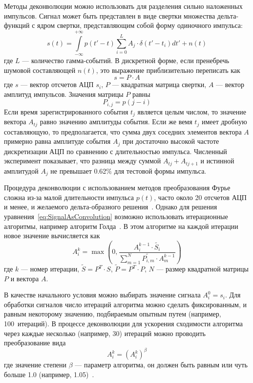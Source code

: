 Методы деконволюции можно использовать для разделения сильно наложенных импульсов. Сигнал может быть представлен в виде свертки множества дельта-функций с ядром свертки, представляющим собой форму одиночного импульса: 
\begin{equation}
  \label{eq:SignalAsConvolution}
  s(t) = \int \limits_{-\infty}^{+\infty} p( t' - t ) \sum \limits_{i=0}^{L} A_j \cdot \delta(t' - t_i) dt' + n(t)
\end{equation}
где $L$ --- количество гамма-событий. В дискретной форме, если пренебречь шумовой составляющей $n(t)$, это выражение приблизительно переписать как 
\begin{equation}
  s = P \cdot A
\end{equation}
где $s$ --- вектор отсчетов АЦП $s_i$, $P$ --- квадратная матрица свертки, $A$ --- вектор амплитуд импульсов. Значения матрицы $P$ равны
\begin{equation*}
  P_{i,j} = p( j - i )
\end{equation*}
Если время зарегистрированного события $t_j$ является целым числом, то значение вектора $A_{tj}$ равно значению амплитуды события. Если же вемя $t_j$ имеет дробную составляющую, то предполагается, что сумма двух соседних элементов вектора $A$ примерно равна амплитуде события $A_j$ при достаточно высокой частоте дискретизации АЦП по сравнению с длительностью импульса. Численный эксперимент показывает, что разница между суммой $A_{tj} + A_{tj+1}$ и истинной амплитудой $A_j$ не превышает 0.62\% для тестовой формы импульса.

Процедура деконволюции с использованием методов преобразования Фурье сложна из-за малой длительности импульса $p(t)$, часто около 20 отсчетов АЦП и менее, и желаемого дельта-образного решения~\cite{Morhac2011}. Однако для решения уравнения~\ref{eq:SignalAsConvolution} возможно использовать итерационные алгоритмы, например алгоритм Голда~\cite{Gold1964}. В этом алгоритме на каждой итерации новое значение вычисляется как
\begin{equation*}
  A_i^k = \max \left( 0, \frac{A_i^{k-1} \cdot \widetilde{S_i} }{ \sum_{m=1}^{N} \widetilde{ P_{i,m} } \cdot A_m^{k-1} } \right)
\end{equation*}
где $k$ --- номер итерации, $\widetilde{S} = P^{T} \cdot S $, $\widetilde{P} = P^{T} \cdot P$, $N$ --- размер квадратной матрицы $P$ и вектора $A$.

В качестве начального условия можно выбирать значение сигнала $A_i^0 = s_i$. Для обработки сигналов число итераций алгоритма можно сделать фиксированным, и равным некоторому значению, подбираемым опытным путем (например, 100~итераций). В процессе деконволюции для ускорения сходимости алгоритма через каждые несколько (например, 30) итераций можно проводить преобразование вида 
\begin{equation*}
  A_i^k = \left( A_i^k \right)^{\beta}
\end{equation*}
где значение степени $\beta$ --- параметр алгоритма, он должен быть равным или чуть больше 1.0 (например, 1.05)~\cite{Morhac2011, Khilkevitch2020}.

